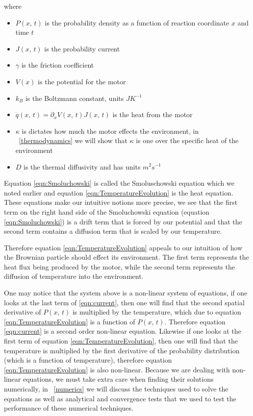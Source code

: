 where
\begin{itemize}
\item{$P(x, \, t)$ is the probability density as a function of  reaction coordinate $x$ and time $t$}
\item{$J(x, \, t)$ is the probability current}
\item{$\gamma$ is the friction coefficient}
\item{$V(x)$ is the potential for the motor}
\item{$k_B$ is the Boltzmann constant, units $J K^{-1}$}
\item{$\dot{q}(x, \, t) = \partial_x V(x, \, t) J(x, \, t)$ is the heat from the motor \cite{M.W.Jack2016}}
\item{$\kappa$ is dictates how much the motor effects the environment, in ~\autoref{thermodynamics} we will show that $\kappa$ is one over the specific heat of the environment}
\item{$D$ is the thermal diffusivity and has units $m^2 s^{-1}$}
\end{itemize}
Equation \ref{eqn:Smoluchowski} is called the Smoluschowski equation which we noted earlier and equation \ref{eqn:TemperatureEvolution} is the heat equation. These equations make our intuitive notions more precise, we see that the first term on the right hand side of the Smoluchowski equation (equation \ref{eqn:Smoluchowski}) is a drift term that is forced by our potential and that the second term contains a diffusion term that is scaled by our temperature.

Therefore equation \ref{eqn:TemperatureEvolution} appeals to our intuition of how the Brownian particle should effect its environment. The first term represents the heat flux being produced by the motor, while the second term represents the diffusion of temperature into the environment.

One may notice that the system above is a non-linear system of equations, if one looks at the last term of \ref{eqn:current}, then one will find that the second spatial derivative of $P(x, \, t)$ is multiplied by the temperature, which due to equation \ref{eqn:TemperatureEvolution} is a function of $P(x, \, t)$. Therefore equation \ref{eqn:current} is a second order non-linear equation. Likewise if one looks at the first term of equation \ref{eqn:TemperatureEvolution}, then one will find that the temperature is multiplied by the first derivative of the probability distribution (which is a function of temperature), therefore equation \ref{eqn:TemperatureEvolution} is also non-linear. Because we are dealing with non-linear equations, we must take extra care when finding their solutions numerically, in ~\autoref{numerics} we will discuss the techniques used to solve the equations as well as analytical and convergence tests that we used to test the performance of these numerical techniques.

